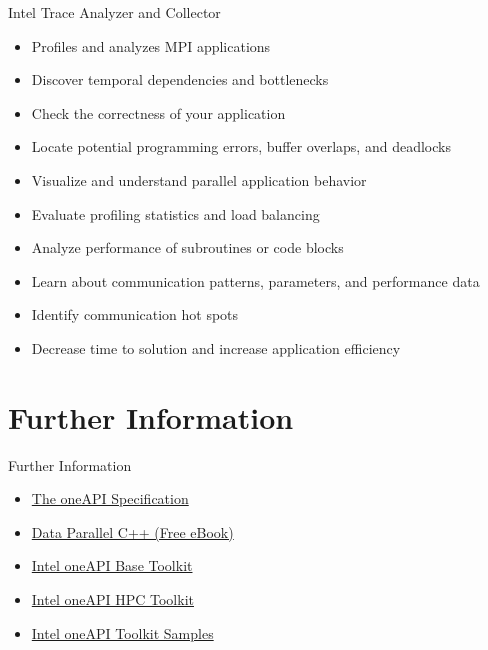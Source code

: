 \documentclass[aspectratio=169]{beamer}
\begin{document}
\begin{frame}{Intel Trace Analyzer and Collector}
\begin{itemize}
  \item Profiles and analyzes MPI applications
  \item Discover temporal dependencies and bottlenecks
  \item Check the correctness of your application
  \item Locate potential programming errors, buffer overlaps, and deadlocks
  \item Visualize and understand parallel application behavior
  \item Evaluate profiling statistics and load balancing
  \item Analyze performance of subroutines or code blocks
  \item Learn about communication patterns, parameters, and performance data
  \item Identify communication hot spots
  \item Decrease time to solution and increase application efficiency
\end{itemize}
\end{frame}

\section{Further Information}

\begin{frame}{Further Information}
\begin{itemize}
  \item \href{https://www.oneapi.com}{The oneAPI Specification}
  \item \href{https://www.apress.com/gp/book/9781484255735}{Data Parallel C++ (Free eBook)}
  \item \href{https://software.intel.com/content/www/us/en/develop/tools/oneapi/base-toolkit.html}{Intel oneAPI Base Toolkit}
  \item \href{https://software.intel.com/content/www/us/en/develop/tools/oneapi/hpc-toolkit.html}{Intel oneAPI HPC Toolkit}
  \item \href{https://github.com/oneapi-src/oneAPI-samples}{Intel oneAPI Toolkit Samples}
\end{itemize}
\end{frame}


\end{document}
